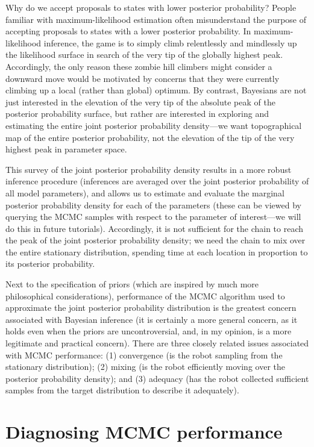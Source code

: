 Why do we accept proposals to states with lower posterior probability? 
People familiar with maximum-likelihood estimation often misunderstand the purpose of accepting proposals to states with a lower posterior probability. 
In maximum-likelihood inference, the game is to simply climb relentlessly and mindlessly up the likelihood surface in search of the very tip of the globally highest peak. 
Accordingly, the only reason these zombie hill climbers might consider a downward move would be motivated by concerns that they were currently climbing up a local (rather than global) optimum. 
By contrast, Bayesians are not just interested in the elevation of the very tip of the absolute peak of the posterior probability surface, but rather are interested in exploring and estimating the entire joint posterior probability density---we want topographical map of the entire posterior probability, not the elevation of the tip of the very highest peak in parameter space.

This survey of the joint posterior probability density results in a more robust inference procedure (inferences are averaged over the joint posterior probability of all model parameters), and allows us to estimate and evaluate the marginal posterior probability density for each of the parameters (these can be viewed by querying the MCMC samples with respect to the parameter of interest---we will do this in future tutorials). 
Accordingly, it is not sufficient for the chain to reach the peak of the joint posterior probability density; we need the chain to mix over the entire stationary distribution, spending time at each location in proportion to its posterior probability.

Next to the specification of priors (which are inspired by much more philosophical considerations), performance of the MCMC algorithm used to approximate the joint posterior probability distribution is the greatest concern associated with Bayesian inference (it is certainly a more general concern, as it holds even when the priors are uncontroversial, and, in my opinion, is a more legitimate and practical concern). 
There are three closely related issues associated with MCMC performance: (1) convergence (is the robot sampling from the stationary distribution); (2) mixing (is the robot efficiently moving over the posterior probability density); and (3) adequacy (has the robot collected sufficient samples from the target distribution to describe it adequately).


\bigskip
\section{Diagnosing MCMC performance}

